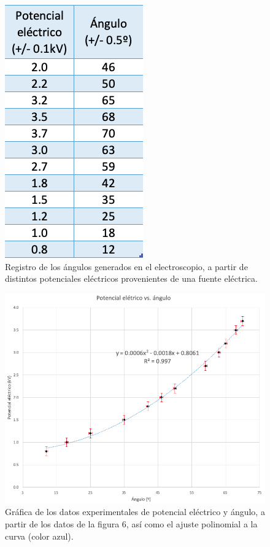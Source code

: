 \documentclass[10pt,journal]{IEEEtran}
\begin{document}
\begin{figure}[H]
\centering
\includegraphics[scale=0.35]{tablapotencial.png}
\caption{Registro de los ángulos generados en el electroscopio, a partir de distintos potenciales eléctricos provenientes de una fuente eléctrica.}
\end{figure}

\begin{figure}[H]
\centering
\includegraphics[scale=0.35]{grafpot.png}
\caption{Gráfica  de  los  datos  experimentales  de  potencial eléctrico y ángulo, a  partir  de los datos de la figura 6, así como el ajuste polinomial a la curva (color azul).}
\label{Fig: Datos}
\end{figure}
\end{document}
